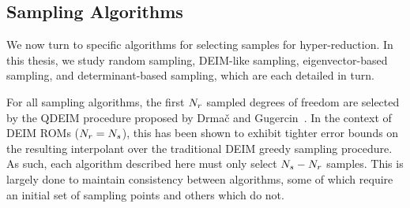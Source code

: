 \subsection{Sampling Algorithms}\label{subsec:sampAlgos}
%
We now turn to specific algorithms for selecting samples for hyper-reduction. In this thesis, we study random sampling, DEIM-like sampling, eigenvector-based sampling, and determinant-based sampling, which are each detailed in turn.

For all sampling algorithms, the first $N_r$ sampled degrees of freedom are selected by the QDEIM procedure proposed by Drma\v{c} and Gugercin~\cite{Drmac2016}. In the context of DEIM ROMs ($N_r = N_s$), this has been shown to exhibit tighter error bounds on the resulting interpolant over the traditional DEIM greedy sampling procedure. As such, each algorithm described here must only select $N_s - N_r$ samples. This is largely done to maintain consistency between algorithms, some of which require an initial set of sampling points and others which do not.

